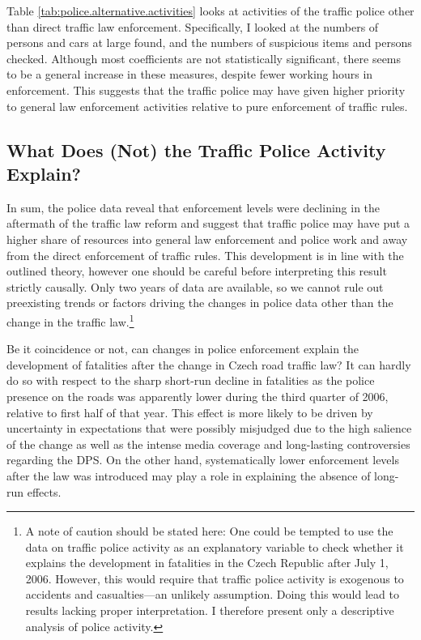 \documentclass[12pt]{article}
\begin{document}
Table \ref{tab:police.alternative.activities} looks at activities of the traffic
police other than direct traffic law enforcement. Specifically, I looked at the
numbers of persons and cars at large found, and the numbers of suspicious items
and persons checked. Although most coefficients are not statistically
significant, there seems to be a general increase in these measures, despite
fewer working hours in enforcement. This suggests that the traffic police may
have given higher priority to general law enforcement activities relative to
pure enforcement of traffic rules.

\subsection{What Does (Not) the Traffic Police Activity Explain?} %

In sum, the police data reveal that enforcement levels were declining in the
aftermath of the traffic law reform and suggest that traffic police may have put
a higher share of resources into general law enforcement and police work and
away from the direct enforcement of traffic rules. This development is in line
with the outlined theory, however one should be careful before interpreting this
result strictly causally. Only two years of data are available, so we cannot
rule out preexisting trends or factors driving the changes in police data other
than the change in the traffic law.\footnote{A note of caution should be stated
  here: One could be tempted to use the data on traffic police activity as an
  explanatory variable to check whether it explains the development in
  fatalities in the Czech Republic after July 1, 2006.  However, this would
  require that traffic police activity is exogenous to accidents and
  casualties---an unlikely assumption. Doing this would lead to results lacking
  proper interpretation. I therefore present only a descriptive analysis of
  police activity.}

Be it coincidence or not, can changes in police enforcement explain  the
development of fatalities after the change in Czech road traffic law? It can
hardly do so with respect to the sharp short-run decline in fatalities as the
police presence on the roads was apparently lower during the third quarter of
2006, relative to first half of that year. This effect is more likely to be
driven by uncertainty in expectations that were possibly misjudged due to the
high salience of the change as well as the intense media coverage and
long-lasting controversies regarding the DPS. On the other hand, systematically
lower enforcement levels after the law was introduced may play a role in
explaining the absence of long-run effects.
\end{document}
